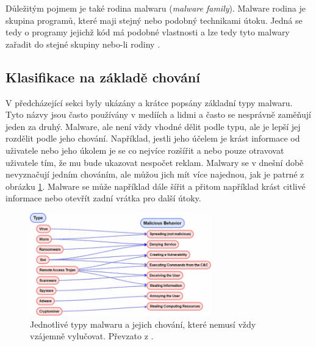 Důležitým pojmem je také rodina malwaru (\textit{malware family}). Malware rodina je skupina programů, které maji stejný nebo podobný technikami útoku. Jedná se tedy o programy jejichž kód má podobné vlastnosti a lze tedy tyto malwary zařadit do stejné skupiny nebo-li rodiny \cite{malware_fam}. 

\subsection*{Klasifikace na základě chování}
V předcházející sekci byly ukázány a krátce popsány základní typy malwaru. Tyto názvy jsou často používány v medíích a lidmi a často se nesprávně zaměňují jeden za druhý.
Malware, ale není vždy vhodné dělit podle typu, ale je lepší jej rozdělit podle jeho chování. Například, jestli jeho účelem je krást informace od uživatele nebo jeho úkolem je se 
co nejvíce rozšířit a nebo pouze otravovat uživatele tím, že mu bude ukazovat nespočet reklam. Malwary se v dnešní době nevyznačují jedním chováním, ale můžou jich mít více najednou, jak 
je patrné z obrázku \ref{behavior}. Malware se může například dále šířit a přitom například krást citlivé informace nebo otevřít zadní vrátka pro další útoky. 

\begin{figure}[h]
	\centering
        \includegraphics[width=0.7\textwidth]{obrazky/behavior.png}
	\caption{Jednotlivé typy malwaru a jejich chování, které nemusí vždy vzájemně vylučovat. Převzato z \cite{article_malware}.}
    \label{behavior}
\end{figure}
\newpage

